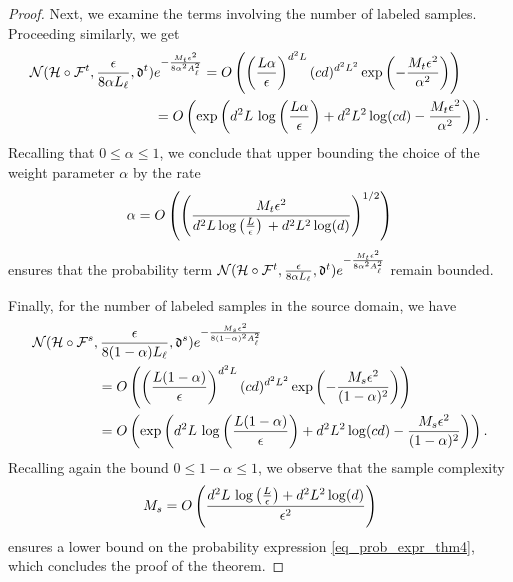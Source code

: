 \documentclass[review,supplement,onefignum,onetabnum]{siamonline250211}
\begin{document}
\begin{proof}
Next, we examine the terms involving the number of labeled samples. Proceeding similarly, we get
%
\begin{equation*}
\begin{split}
 \mathcal{N}( \mathcal{H} \circ \mathcal{F}^t, \frac{\epsilon}{8 \alpha L_\ell}, \mathfrak{d}^t) &e^{-\frac{M_t \epsilon^2}{8 \alpha^2 A_\ell^2}}
 =
O\left( 
\left( \frac{  L \alpha }{\epsilon}  \right)^{{d}^2 L}   (c {d})^{{d}^2 L^2} 
\exp \left(- \frac{M_t \epsilon^2}{\alpha^2} \right)
\right) \\
&=O\left(
\exp \left(
{d}^2 L \, \log\left( \frac{  L \alpha }{\epsilon}  \right)
+ 
{d}^2 L^2 \log(c {d}) 
- 
\frac{M_t \epsilon^2}{\alpha^2}
\right)
\right).
\end{split}
\end{equation*}
%
Recalling that $0\leq \alpha \leq 1$, we conclude that upper bounding the choice of the weight parameter $\alpha$ by the rate
% 
\begin{equation*}
\begin{split}
\alpha
= O \left(
\left(
\frac
{M_t \epsilon^2}
{{d}^2 L \log \left( \frac{  L }{\epsilon} \right)  \, 
+ 
{d}^2 L^2 \log({d}) }
\right)^{1/2}
\right)
\end{split}
\end{equation*}
%
ensures that the probability term $ \mathcal{N}( \mathcal{H} \circ \mathcal{F}^t, \frac{\epsilon}{8 \alpha L_\ell}, \mathfrak{d}^t) e^{-\frac{M_t \epsilon^2}{8 \alpha^2 A_\ell^2}}$ remain bounded.

Finally, for the number of labeled samples in the source domain, we have
%
\begin{equation*}
\begin{split}
 \mathcal{N}( \mathcal{H} \circ \mathcal{F}^s, & \, \frac{\epsilon}{8 (1-\alpha) L_\ell},   \mathfrak{d}^s) e^{-\frac{M_s \epsilon^2}{8 (1-\alpha)^2 A_\ell^2}} \\
 &=
O\left( 
\left( \frac{  L (1-\alpha) }{\epsilon}  \right)^{{d}^2 L}   (c {d})^{{d}^2 L^2} 
\exp \left(- \frac{M_s \epsilon^2}{(1-\alpha)^2} \right)
\right) \\
&=O\left(
\exp \left(
{d}^2 L \, \log\left( \frac{  L (1-\alpha) }{\epsilon}  \right)
+ 
{d}^2 L^2 \log(c {d}) 
- 
\frac{M_s \epsilon^2}{(1-\alpha)^2}
\right)
\right).
\end{split}
\end{equation*}
%
Recalling again the bound $0\leq 1-\alpha \leq 1$, we observe that the sample complexity 
%
\begin{equation*}
\begin{split}
M_s = 
 O \left(
\frac{{d}^2 L \, \log\left( \frac{  L }{\epsilon}  \right)
+ 
{d}^2 L^2 \log({d}) }
{\epsilon^2}
\right)
\end{split}
\end{equation*}
%
ensures a lower bound on the probability expression \eqref{eq_prob_expr_thm4}, which concludes the proof of the theorem.
%
\end{proof}
\end{document}
